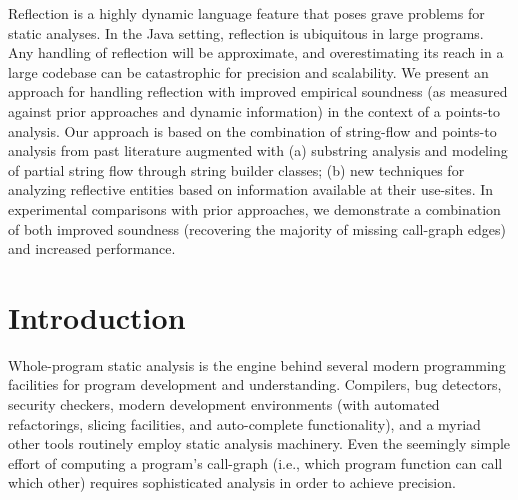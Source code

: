\label{chapter:reflection}

Reflection is a highly dynamic language feature that poses grave
problems for static analyses.  In the Java setting, reflection is
ubiquitous in large programs.
Any handling of reflection will be approximate, and overestimating its
reach in a large codebase can be catastrophic for precision and
scalability. We present an approach for handling reflection with
improved empirical soundness (as measured against prior approaches and
dynamic information) in the context of a points-to analysis. Our
approach is based on the combination of string-flow and points-to
analysis from past literature augmented with (a) substring analysis
and modeling of partial string flow through string builder classes;
(b) new techniques for analyzing reflective entities based on
information available at their use-sites.
In experimental comparisons with prior approaches, we demonstrate a
combination of both improved soundness (recovering the majority of
missing call-graph edges) and increased performance.


\section{Introduction}

Whole-program static analysis is the engine behind several modern
programming facilities for program development and
understanding. Compilers, bug detectors, security checkers, modern
development environments (with automated refactorings, slicing
facilities, and auto-complete functionality), and a myriad other tools
routinely employ static analysis machinery. Even the seemingly simple
effort of computing a program's call-graph (i.e., which program
function can call which other) requires sophisticated analysis in
order to achieve precision.

